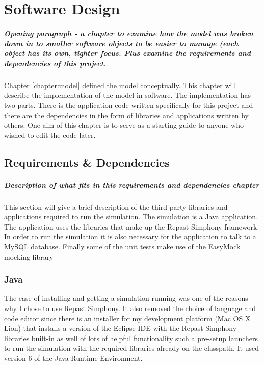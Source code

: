 \chapter{Software Design}\label{chapter:softwaredesign}

\paragraph{Opening paragraph - a chapter to examine how the model was
  broken down in to smaller software objects to be easier to manage
  (each object has its own, tighter focus. Plus examine the
  requirements and dependencies of this project.}

Chapter \ref{chapter:model} defined the model conceptually. This
chapter will describe the implementation of the model in software. The
implementation has two parts. There is the application code written
specifically for this project and there are the dependencies in the
form of libraries and applications written by others. One aim of this
chapter is to serve as a starting guide to anyone who wished to edit
the code later.


\section{Requirements \& Dependencies}
  \paragraph{Description of what fits in this requirements and
    dependencies chapter}
This section will give a brief description of the third-party
libraries and applications required to run the simulation. The
simulation is a Java application. The application uses the libraries that make up the Repast Simphony
framework. In order to run the simulation it is also necessary for the
application to talk to a MySQL database. Finally some of the unit 
tests make use of the EasyMock mocking library 

  \subsection{Java}
  The ease of installing and getting a simulation running was one of
  the reasons why I chose to use Repast Simphony. It also removed the
  choice of language and code editor since there is an
  installer for my development platform (Mac OS X Lion) that installs a version of the Eclipse IDE
  with the Repast Simphony libraries built-in as well of lots of
  helpful functionality such a pre-setup launchers to run the simulation
  with the required libraries already on the classpath. It used
  version 6 of the Java Runtime Environment.

